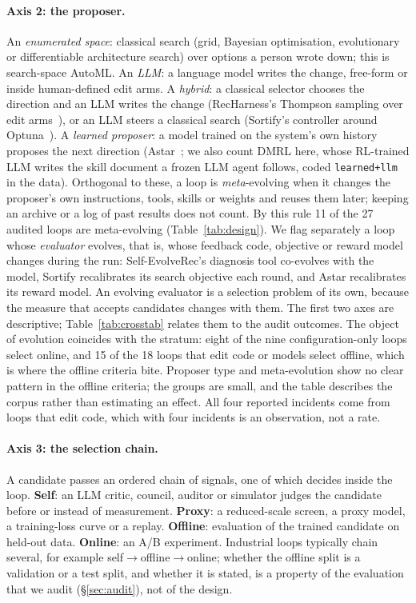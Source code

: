 \documentclass[sigconf,nonacm]{acmart}
\begin{document}
\paragraph{Axis 2: the proposer.}
An \emph{enumerated space}: classical search (grid, Bayesian optimisation, evolutionary or differentiable
architecture search) over options a person wrote down; this is search-space AutoML. An \emph{LLM}: a language model
writes the change, free-form or inside human-defined edit arms. A \emph{hybrid}: a classical selector chooses the
direction and an LLM writes the change (RecHarness's Thompson sampling over edit arms~\cite{ling2026recharness}), or an
LLM steers a classical search (Sortify's controller around Optuna~\cite{cheng2026sortify}). A \emph{learned proposer}:
a model trained on the system's own history proposes the next direction (Astar~\cite{hu2026astar}; we also count DMRL here, whose RL-trained LLM writes the skill document a frozen LLM agent follows, coded \texttt{learned+llm} in the data). Orthogonal to
these, a loop is \emph{meta}-evolving when it changes the proposer's own instructions, tools, skills or weights and
reuses them later; keeping an archive or a log of past results does not count. By this rule 11 of the 27 audited loops
are meta-evolving (Table~\ref{tab:design}). We flag separately a loop whose \emph{evaluator} evolves, that is,
whose feedback code, objective or reward model changes during the run: Self-EvolveRec's diagnosis tool co-evolves with
the model, Sortify recalibrates its search objective each round, and Astar recalibrates its reward model. An evolving
evaluator is a selection problem of its own, because the measure that accepts candidates changes with them.
The first two axes are descriptive; Table~\ref{tab:crosstab} relates them to the audit outcomes.
The object of evolution coincides with the stratum: eight of the nine configuration-only loops select online, and 15 of
the 18 loops that edit code or models select offline, which is where the offline criteria bite. Proposer type and
meta-evolution show no clear pattern in the offline criteria; the groups are small, and the table describes the
corpus rather than estimating an effect. All four reported incidents come from loops that edit code, which with four incidents is an observation, not a rate.



\paragraph{Axis 3: the selection chain.}
A candidate passes an ordered chain of signals, one of which decides inside the loop. \textbf{Self}: an LLM critic,
council, auditor or simulator judges the candidate before or instead of measurement. \textbf{Proxy}: a reduced-scale
screen, a proxy model, a training-loss curve or a replay. \textbf{Offline}: evaluation of the trained candidate on
held-out data. \textbf{Online}: an A/B experiment. Industrial loops typically chain several, for example
self$\rightarrow$offline$\rightarrow$online; whether the offline split is a validation or a test split, and whether it is
stated, is a property of the evaluation that we audit (\S\ref{sec:audit}), not of the design.
\end{document}
